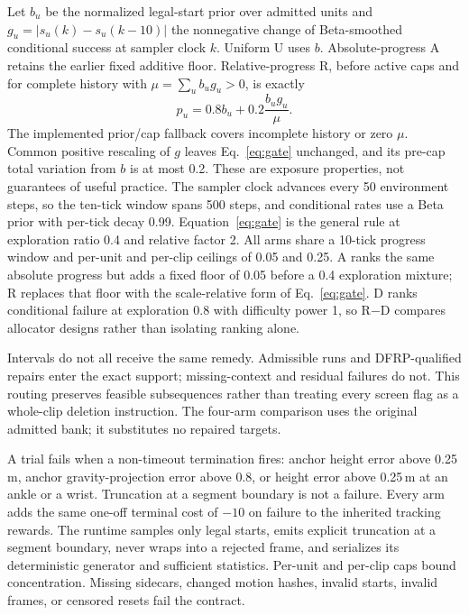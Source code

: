 \documentclass[letterpaper,10pt,conference]{ieeeconf}
\begin{document}
Let $b_u$ be the normalized legal-start prior over admitted units and
$g_u=|s_u(k)-s_u(k-10)|$ the nonnegative change of Beta-smoothed conditional success
at sampler clock $k$. Uniform U uses $b$. Absolute-progress A retains the earlier
fixed additive floor. Relative-progress R, before active caps and for complete
history with $\mu=\sum_u b_ug_u>0$, is exactly
\begin{equation}
p_u=0.8b_u+0.2\frac{b_ug_u}{\mu}.
\label{eq:gate}
\end{equation}
The implemented prior/cap fallback covers incomplete history or zero $\mu$.
Common positive rescaling of $g$ leaves Eq.~\eqref{eq:gate} unchanged, and its
pre-cap total variation from $b$ is at most 0.2. These are exposure properties,
not guarantees of useful practice. The sampler clock advances every 50 environment steps, so the
ten-tick window spans 500 steps, and conditional rates use a Beta prior with per-tick decay 0.99.
Equation~\eqref{eq:gate} is the general rule at exploration ratio 0.4 and relative factor 2.
All arms share a 10-tick progress window and per-unit
and per-clip ceilings of 0.05 and 0.25. A ranks the same absolute progress but adds a fixed
floor of 0.05 before a 0.4 exploration mixture; R replaces that floor with the scale-relative
form of Eq.~\eqref{eq:gate}. D ranks conditional failure at exploration 0.8 with difficulty
power 1, so R$-$D compares allocator designs rather than isolating ranking alone.

Intervals do not all receive the same remedy. Admissible runs and DFRP-qualified repairs enter the
exact support; missing-context and residual failures do not. This routing preserves feasible
subsequences rather than treating every screen flag as a whole-clip deletion instruction.
The four-arm comparison uses the original admitted bank; it substitutes no repaired targets.

A trial fails when a non-timeout termination fires: anchor height error above 0.25\,m, anchor
gravity-projection error above 0.8, or height error above 0.25\,m at an ankle or a wrist.
Truncation at a segment boundary is not a failure. Every arm adds the same one-off terminal cost
of $-10$ on failure to the inherited tracking rewards.
The runtime samples only legal starts, emits explicit truncation at a segment boundary, never
wraps into a rejected frame, and serializes its deterministic generator and sufficient
statistics. Per-unit and per-clip caps bound concentration. Missing sidecars, changed motion
hashes, invalid starts, invalid frames, or censored resets fail the contract.
\end{document}
